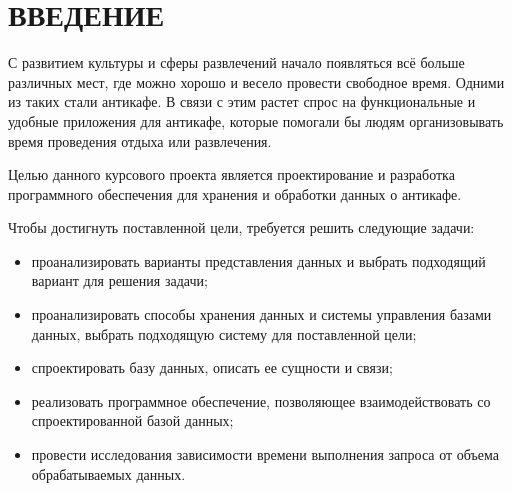 \chapter*{ВВЕДЕНИЕ}

С развитием культуры и сферы развлечений начало появляться всё больше различных мест, где можно хорошо и весело провести свободное время. Одними из таких стали антикафе.
В связи с этим растет спрос на функциональные и удобные приложения для антикафе, которые помогали бы людям организовывать время проведения отдыха или развлечения.

Целью данного курсового проекта является проектирование и разработка программного обеспечения для хранения и обработки данных о антикафе.

Чтобы достигнуть поставленной цели, требуется решить следующие задачи:
\begin{itemize}
	\item проанализировать варианты представления данных и выбрать подходящий вариант для решения задачи;
	\item проанализировать способы хранения данных и системы управления базами данных, выбрать подходящую систему для поставленной цели;
	\item спроектировать базу данных, описать ее сущности и связи;
	\item реализовать программное обеспечение, позволяющее взаимодействовать со спроектированной базой данных;
	\item провести исследования зависимости времени выполнения запроса от объема обрабатываемых данных.  
\end{itemize}
